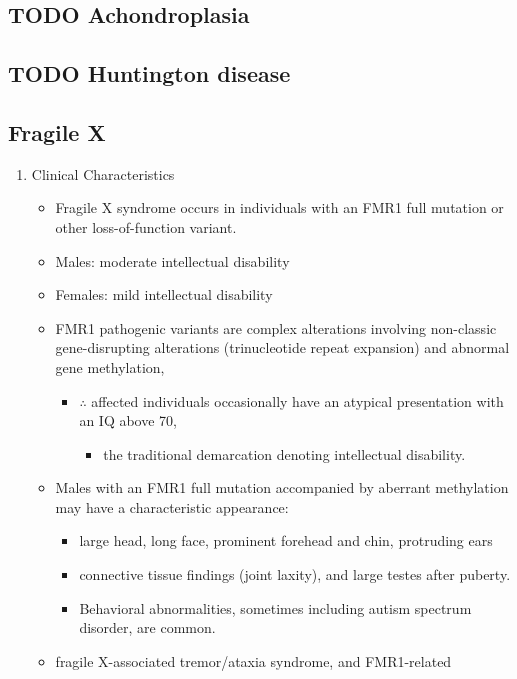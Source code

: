 \documentclass{scrartcl}
\begin{document}
\subsection{{\bfseries\sffamily TODO} Achondroplasia}
\label{sec:org862db74}
\subsection{{\bfseries\sffamily TODO} Huntington disease}
\label{sec:org9919bbd}
\subsection{Fragile X}
\label{sec:orgba4b63c}
\begin{enumerate}
\item Clinical Characteristics
\label{sec:org860dff5}
\begin{itemize}
\item Fragile X syndrome occurs in individuals with an FMR1 full mutation
or other loss-of-function variant.
\item Males: moderate intellectual disability
\item Females: mild intellectual disability
\item FMR1 pathogenic variants are complex alterations involving non-classic
gene-disrupting alterations (trinucleotide repeat expansion) and
abnormal gene methylation,
\begin{itemize}
\item \(\therefore\) affected individuals occasionally have an atypical presentation with an IQ above 70,
\begin{itemize}
\item the traditional  demarcation denoting intellectual disability.
\end{itemize}
\end{itemize}
\item Males with an FMR1 full mutation accompanied by aberrant methylation may have a characteristic appearance:
\begin{itemize}
\item large head, long face, prominent forehead and chin, protruding ears
\item connective tissue findings (joint laxity), and large testes after puberty.
\item Behavioral abnormalities, sometimes including autism spectrum disorder, are common.
\end{itemize}
\item fragile X-associated tremor/ataxia syndrome, and FMR1-related

\end{itemize}
\end{enumerate}
\end{document}

